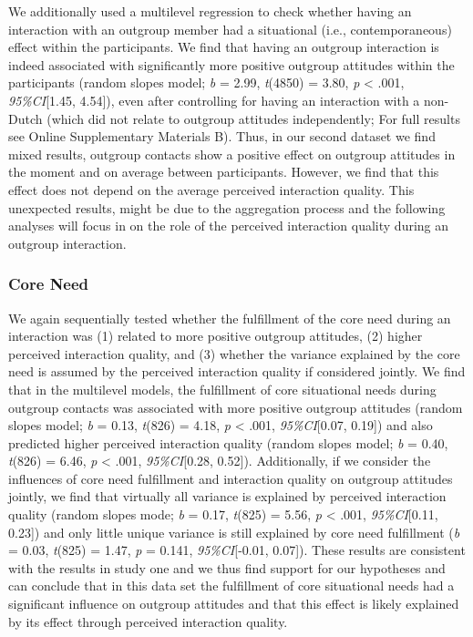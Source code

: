 We additionally used a multilevel regression to check whether having an
interaction with an outgroup member had a situational (i.e.,
contemporaneous) effect within the participants. We find that having an
outgroup interaction is indeed associated with significantly more
positive outgroup attitudes within the participants (random slopes
model; \textit{b} = 2.99, \textit{t}(4850) = 3.80, \textit{p}
\textless{} .001, \textit{95\%CI}{[}1.45, 4.54{]}), even after
controlling for having an interaction with a non-Dutch (which did not
relate to outgroup attitudes independently; For full results see Online
Supplementary Materials B). Thus, in our second dataset we find mixed
results, outgroup contacts show a positive effect on outgroup attitudes
in the moment and on average between participants. However, we find that
this effect does not depend on the average perceived interaction
quality. This unexpected results, might be due to the aggregation
process and the following analyses will focus in on the role of the
perceived interaction quality during an outgroup interaction.

\subsubsection{Core Need}

We again sequentially tested whether the fulfillment of the core need
during an interaction was (1) related to more positive outgroup
attitudes, (2) higher perceived interaction quality, and (3) whether the
variance explained by the core need is assumed by the perceived
interaction quality if considered jointly. We find that in the
multilevel models, the fulfillment of core situational needs during
outgroup contacts was associated with more positive outgroup attitudes
(random slopes model; \textit{b} = 0.13, \textit{t}(826) = 4.18,
\textit{p} \textless{} .001, \textit{95\%CI}{[}0.07, 0.19{]}) and also
predicted higher perceived interaction quality (random slopes model;
\textit{b} = 0.40, \textit{t}(826) = 6.46, \textit{p} \textless{} .001,
\textit{95\%CI}{[}0.28, 0.52{]}). Additionally, if we consider the
influences of core need fulfillment and interaction quality on outgroup
attitudes jointly, we find that virtually all variance is explained by
perceived interaction quality (random slopes mode; \textit{b} = 0.17,
\textit{t}(825) = 5.56, \textit{p} \textless{} .001,
\textit{95\%CI}{[}0.11, 0.23{]}) and only little unique variance is
still explained by core need fulfillment (\textit{b} = 0.03,
\textit{t}(825) = 1.47, \textit{p} = 0.141, \textit{95\%CI}{[}-0.01,
0.07{]}). These results are consistent with the results in study one and
we thus find support for our hypotheses and can conclude that in this
data set the fulfillment of core situational needs had a significant
influence on outgroup attitudes and that this effect is likely explained
by its effect through perceived interaction quality.

